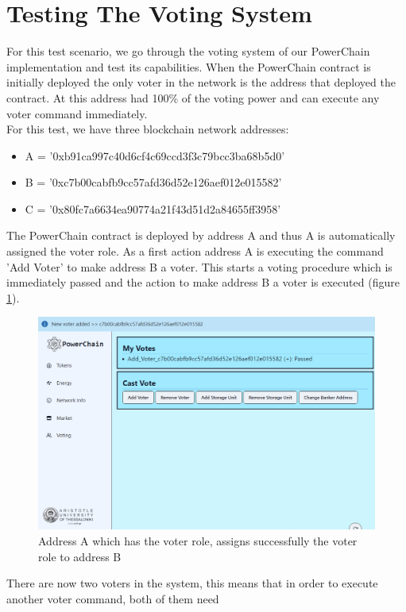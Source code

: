 \section{Testing The Voting System}
For this test scenario, we go through the voting system of our PowerChain implementation and test its capabilities.
When the PowerChain contract is initially deployed the only voter in the network is the address that deployed the contract.
At this address had 100\% of the voting power and can execute any voter command immediately.\\
For this test, we have three blockchain network addresses: 
\begin{itemize}
    \item A = '0xb91ca997c40d6cf4c69ccd3f3c79bcc3ba68b5d0'
    \item B = '0xc7b00cabfb9cc57afd36d52e126aef012e015582'
    \item C = '0x80fc7a6634ea90774a21f43d51d2a84655ff3958'
\end{itemize}
The PowerChain contract is deployed by address A and thus A is automatically assigned the voter role.
As a first action address A is executing the command 'Add Voter' to make address B a voter. This starts 
a voting procedure which is immediately passed and the action to make address B a voter is executed (figure \ref{fig:voter_added}).
\begin{figure}[h!]
    \centering
    \includegraphics[width=\linewidth,frame,scale=0.7]{Figures/voter_added.png}
    \caption{Address A which has the voter role, assigns successfully the voter role to address B}
    \label{fig:voter_added}
\end{figure}
There are now two voters in the system, this means that in order to execute another voter command, both of them need
